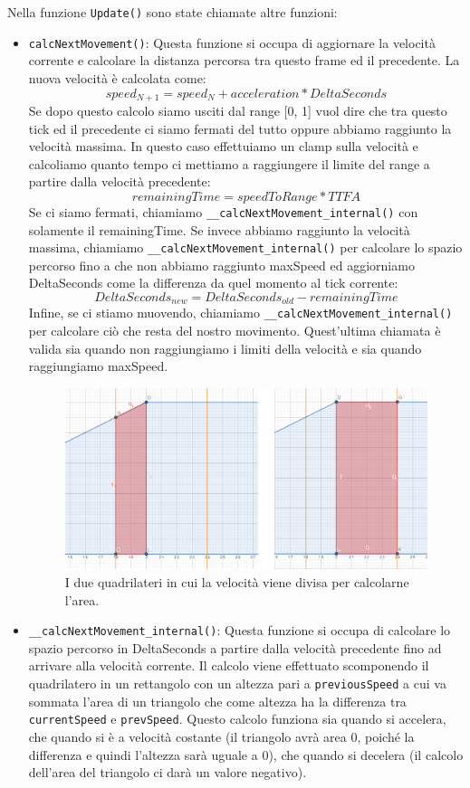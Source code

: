 \documentclass[main.tex]{subfiles}
\begin{document}
Nella funzione \lstinline{Update()} sono state chiamate altre funzioni:
\begin{itemize}
    \item \lstinline{calcNextMovement()}: Questa funzione si occupa di aggiornare la velocità corrente e calcolare la distanza percorsa tra questo frame ed il precedente. La nuova velocità è calcolata come:
    \[speed_{N+1} = speed_{N} + acceleration * DeltaSeconds\]
    Se dopo questo calcolo siamo usciti dal range [0, 1] vuol dire che tra questo tick ed il precedente ci siamo fermati del tutto oppure abbiamo raggiunto la velocità massima. In questo caso effettuiamo un clamp sulla velocità e calcoliamo quanto tempo ci mettiamo a raggiungere il limite del range a partire dalla velocità precedente:
    \[remainingTime = speedToRange * TTFA\]
    Se ci siamo fermati, chiamiamo \lstinline{__calcNextMovement_internal()} con solamente il remainingTime. Se invece abbiamo raggiunto la velocità massima, chiamiamo \lstinline{__calcNextMovement_internal()} per calcolare lo spazio percorso fino a che non abbiamo raggiunto maxSpeed ed aggiorniamo DeltaSeconds come la differenza da quel momento al tick corrente:
    \[DeltaSeconds_{new} = DeltaSeconds_{old} - remainingTime\]
    Infine, se ci stiamo muovendo, chiamiamo \lstinline{__calcNextMovement_internal()} per calcolare ciò che resta del nostro movimento. Quest'ultima chiamata è valida sia quando non raggiungiamo i limiti della velocità e sia quando raggiungiamo maxSpeed.
    \begin{figure}[H]
        \centering
        \includegraphics[width=.8\linewidth]{img/interpolazione/calcNextMovementLateCall.png}
        \caption{I due quadrilateri in cui la velocità viene divisa per calcolarne l'area.}
        \label{fig:4_calcNextMovementLateCall}
    \end{figure}
    \item \lstinline{__calcNextMovement_internal()}: Questa funzione si occupa di calcolare lo spazio percorso in DeltaSeconds a partire dalla velocità precedente fino ad arrivare alla velocità corrente. Il calcolo viene effettuato scomponendo il quadrilatero in un rettangolo con un altezza pari a \lstinline{previousSpeed} a cui va sommata l'area di un triangolo che come altezza ha la differenza tra \lstinline{currentSpeed} e \lstinline{prevSpeed}. Questo calcolo funziona sia quando si accelera, che quando si è a velocità costante (il triangolo avrà area 0, poiché la differenza e quindi l'altezza sarà uguale a 0), che quando si decelera (il calcolo dell'area del triangolo ci darà un valore negativo).

\end{itemize}
\end{document}
